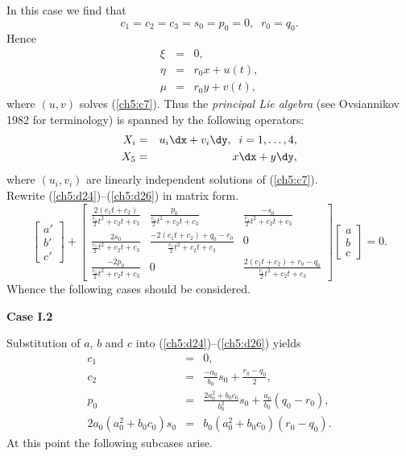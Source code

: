 In this case we find that
\[c_1=c_2=c_3=s_0=p_0=0,\;\;r_0=q_0.\]
Hence
\begin{eqnarray}
\xi &= & 0, \label{ch5:d27}\\
\eta & = & r_0 x+u(t), \label{ch5:d28}\\
\mu & =& r_0 y+v(t), \label{ch5:d29}
\end{eqnarray}
where $(u,v)$ solves (\ref{ch5:c7}). Thus the {\em principal Lie algebra}
(see Ovsiannikov 1982 for terminology) is spanned by the following operators:
\begin{eqnarray}
X_i &=& u_i \dx+ v_i \dy,\;\;i=1,\ldots,4, \label{ch5:d30}\\
X_5 & =& x \dx+ y \dy, \label{ch5:d31}
\end{eqnarray}
where $(u_i,v_i)$ are linearly independent solutions of (\ref{ch5:c7}).\\
Rewrite (\ref{ch5:d24})--(\ref{ch5:d26}) in matrix form.
\[ \left [ \begin{array}{l}
            a'\\
            b'\\
            c'
            \end{array}
   \right ]  +
\left [ \begin{array}{lll}

\displaystyle{\frac{2(c_1t+c_2)}{\frac{c_1}{2}t^2+c_2t+c_3 }} &
\displaystyle{\frac{p_0}{\frac{c_1}{2}t^2+c_2t+c_3 }} &
\displaystyle{\frac{-s_0}{\frac{c_1}{2}t^2+c_2t+c_3 }}\\
\displaystyle{\frac{2s_0}{\frac{c_1}{2}t^2+c_2t+c_3 }} &
\displaystyle{\frac{-2(c_1t+c_2)+q_0-r_0}{\frac{c_1}{2}t^2+c_2t+c_3 }} &    0\\
\displaystyle{\frac{-2p_0}{\frac{c_1}{2}t^2+c_2t+c_3 }} & 0 &
\displaystyle{\frac{2(c_1t+c_2)+r_0-q_0}{\frac{c_1}{2}t^2+c_2t+c_3 }}

\end{array}
\right ]
\left [ \begin{array}{l}
           a\\
           b\\
           c
           \end{array}
 \right ] =0.
\]
Whence the following cases should be considered.

{\bf Case I.2  } 

Substitution of $a$, $b$ and $c$ into (\ref{ch5:d24})--(\ref{ch5:d26}) yields
\begin{eqnarray*}
c_1 &=& 0,\\
c_2 &=& \frac{-a_0}{b_0}s_0+\frac{r_0-q_0}{2},\\
p_0 & =& \frac{2a_0^2+b_0c_0}{b_0^2}s_0+\frac{a_0}{b_0}(q_0-r_0),\\
2a_0(a_0^2+b_0c_0)s_0 &= & b_0(a_0^2+b_0c_0)(r_0-q_0).
\end{eqnarray*}
At this point the following subcases arise. 

